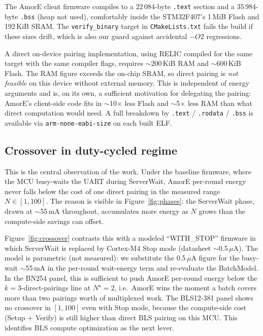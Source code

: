 \documentclass[11pt,a4paper]{article}
\begin{document}
The AmorE client firmware compiles to a 22\,084-byte \texttt{.text}
section and a 35\,984-byte \texttt{.bss} (heap not used), comfortably
inside the STM32F407's 1\,MiB Flash and 192\,KiB SRAM. The
\texttt{verify\_binary} target in \texttt{CMakeLists.txt} fails the
build if these sizes drift, which is also our guard against accidental
$-O2$ regressions.

A direct on-device pairing implementation, using RELIC compiled for
the same target with the same compiler flags, requires
$\sim$200\,KiB RAM and $\sim$600\,KiB Flash. The RAM figure exceeds
the on-chip SRAM, so direct pairing is \emph{not feasible} on this
device without external memory. This is independent of energy
arguments and is, on its own, a sufficient motivation for delegating
the pairing: AmorE's client-side code fits in $\sim$10$\times$ less
Flash and $\sim$5$\times$ less RAM than what direct computation would
need. A full breakdown by \texttt{.text} / \texttt{.rodata} / \texttt{.bss}
is available via \texttt{arm-none-eabi-size} on each built ELF.

\subsection{Crossover in duty-cycled regime}

This is the central observation of the work. Under the baseline
firmware, where the MCU busy-waits the UART during ServerWait,
AmorE per-round energy never falls below the cost of one direct
pairing in the measured range $N\!\in\![1,100]$. The reason is
visible in Figure~\ref{fig:phases}: the ServerWait phase, drawn at
$\sim$55\,mA throughout, accumulates more energy as $N$ grows than
the compute-side savings can offset.

Figure~\ref{fig:crossover} contrasts this with a modeled
``WITH\_STOP'' firmware in which ServerWait is replaced by Cortex-M4
Stop mode (datasheet $\sim$0.5\,$\mu$A). The model is parametric
(not measured): we substitute the 0.5\,$\mu$A figure for the
busy-wait $\sim$55\,mA in the per-round wait-energy term and re-evaluate
the BatchModel. In the BN254 panel, this is sufficient to push AmorE
per-round energy below the $k\!=\!3$-direct-pairings line at
$N^{\star}\!=\!2$, i.e.\ AmorE wins the moment a batch covers more
than two pairings worth of multiplexed work. The BLS12-381 panel
shows no crossover in $[1,100]$ even with Stop mode, because the
compute-side cost (Setup + Verify) is still higher than direct
BLS pairing on this MCU. This identifies BLS compute optimization
as the next lever.
\end{document}
